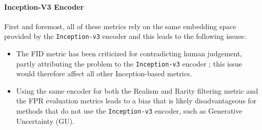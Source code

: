 \paragraph{Inception-V3 Encoder}
First and foremost, all of these metrics rely on the same embedding space provided by the \texttt{Inception-v3} encoder and this leads to the following issues:
\begin{itemize}
    \item The FID metric has been criticized for contradicting human judgement, partly attributing the problem to the \texttt{Inception-v3} encoder \parencite{jayasumana_rethinking_2024}; this issue would therefore affect all other Inception-based metrics.
    \item Using the same encoder for both the Realism and Rarity filtering metric and the \acs{FPR} evaluation metrics leads to a bias that is likely disadvantageous for methods that do not use the \texttt{Inception-v3} encoder, such as \cite{jazbec_generative_2025} Generative Uncertainty (\acs{GU}).
\end{itemize}




